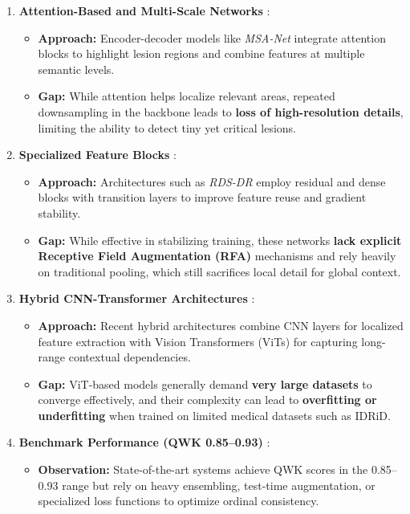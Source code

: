 \documentclass[12pt,a4paper]{article}
\begin{document}
\begin{enumerate}
    \item \textbf{Attention-Based and Multi-Scale Networks} \cite{AlAntary2021}:
    \begin{itemize}[noitemsep, topsep=0pt]
        \item \textbf{Approach:} Encoder-decoder models like \textit{MSA-Net} integrate attention blocks to highlight lesion regions and combine features at multiple semantic levels.
        \item \textbf{Gap:} While attention helps localize relevant areas, repeated downsampling in the backbone leads to \textbf{loss of high-resolution details}, limiting the ability to detect tiny yet critical lesions.
    \end{itemize}
    \newpage
    \item \textbf{Specialized Feature Blocks} \cite{Ahammed2023}:
    \begin{itemize}[noitemsep, topsep=0pt]
        \item \textbf{Approach:} Architectures such as \textit{RDS-DR} employ residual and dense blocks with transition layers to improve feature reuse and gradient stability.
        \item \textbf{Gap:} While effective in stabilizing training, these networks \textbf{lack explicit Receptive Field Augmentation (RFA)} mechanisms and rely heavily on traditional pooling, which still sacrifices local detail for global context.
    \end{itemize}

    \item \textbf{Hybrid CNN-Transformer Architectures} \cite{Zhang2024}:
    \begin{itemize}[noitemsep, topsep=0pt]
        \item \textbf{Approach:} Recent hybrid architectures combine CNN layers for localized feature extraction with Vision Transformers (ViTs) for capturing long-range contextual dependencies.
        \item \textbf{Gap:} ViT-based models generally demand \textbf{very large datasets} to converge effectively, and their complexity can lead to \textbf{overfitting or underfitting} when trained on limited medical datasets such as IDRiD.
    \end{itemize}
    
    \item \textbf{Benchmark Performance (QWK 0.85–0.93)} \cite{Tymchenko2020}:
    \begin{itemize}[noitemsep, topsep=0pt]
        \item \textbf{Observation:} State-of-the-art systems achieve QWK scores in the 0.85–0.93 range but rely on heavy ensembling, test-time augmentation, or specialized loss functions to optimize ordinal consistency.
    \end{itemize}
\end{enumerate}
\end{document}
